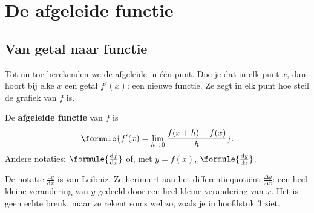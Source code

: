\begin{oefeningen}
\end{oefeningen}

\section{De afgeleide functie}

\subsection{Van getal naar functie}

Tot nu toe berekenden we de afgeleide in één punt. Doe je dat in elk punt $x$, dan hoort bij elke $x$ een getal $f'(x)$: een nieuwe functie. Ze zegt in elk punt hoe steil de grafiek van $f$ is.

\begin{theorie}
De \textbf{\textcolor{accent}{afgeleide functie}} van $f$ is
\[\formule{f'(x) = \lim_{h \to 0} \frac{f(x + h) - f(x)}{h}}.\]
Andere notaties: $\formule{\frac{\mathrm{d}f}{\mathrm{d}x}}$ of, met $y = f(x)$, $\formule{\frac{\mathrm{d}y}{\mathrm{d}x}}$.
\end{theorie}

De notatie $\frac{\mathrm{d}y}{\mathrm{d}x}$ is van Leibniz. Ze herinnert aan het differentiequotiënt $\frac{\Delta y}{\Delta x}$: een heel kleine verandering van $y$ gedeeld door een heel kleine verandering van $x$. Het is geen echte breuk, maar ze rekent soms wel zo, zoals je in hoofdstuk 3 ziet.


